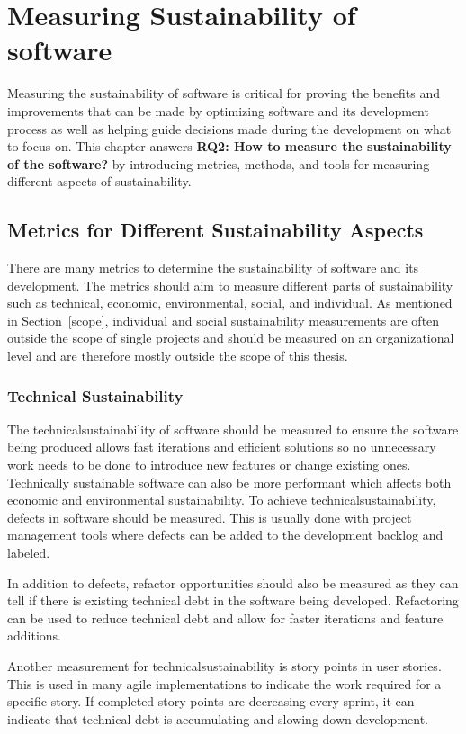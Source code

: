 \chapter{Measuring Sustainability of software}\label{chapter4}
Measuring the sustainability of software is critical for proving the benefits and improvements that can be made by optimizing software and its development process as well as helping guide decisions made during the development on what to focus on. This chapter answers \textbf{RQ2: How to measure the sustainability of the software?} by introducing metrics, methods, and tools for measuring different aspects of sustainability. 

\section{Metrics for Different Sustainability Aspects}\label{susmetrics}
There are many metrics to determine the sustainability of software and its development. The metrics should aim to measure different parts of sustainability such as technical, economic, environmental, social, and individual. As mentioned in Section~\ref{scope}, individual and social sustainability measurements are often outside the scope of single projects and should be measured on an organizational level and are therefore mostly outside the scope of this thesis.

\subsection{Technical Sustainability}
The \gls{technicalsustainability} of software should be measured to ensure the software being produced allows fast iterations and efficient solutions so no unnecessary work needs to be done to introduce new features or change existing ones. Technically sustainable software can also be more performant which affects both economic and environmental sustainability. To achieve \gls{technicalsustainability}, defects in software should be measured. This is usually done with project management tools where defects can be added to the development backlog and labeled.

In addition to defects, refactor opportunities should also be measured as they can tell if there is existing technical debt in the software being developed. Refactoring can be used to reduce technical debt and allow for faster iterations and feature additions.

Another measurement for \gls{technicalsustainability} is story points in user stories. This is used in many agile implementations to indicate the work required for a specific story. If completed story points are decreasing every sprint, it can indicate that technical debt is accumulating and slowing down development.

